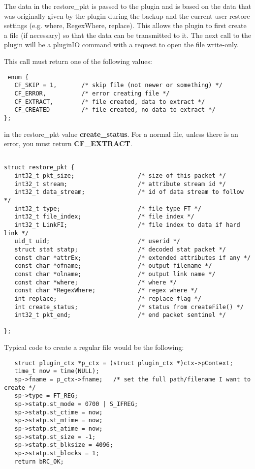 The data in the 
restore\_pkt is passed to the plugin and is based on the data that was
originally given by the plugin during the backup and the current user
restore settings (e.g. where, RegexWhere, replace).  This allows the
plugin to first create a file (if necessary) so that the data can
be transmitted to it.  The next call to the plugin will be a
pluginIO command with a request to open the file write-only.

This call must return one of the following values:

\begin{verbatim}
 enum {
   CF_SKIP = 1,       /* skip file (not newer or something) */
   CF_ERROR,          /* error creating file */
   CF_EXTRACT,        /* file created, data to extract */
   CF_CREATED         /* file created, no data to extract */
};
\end{verbatim}

in the restore\_pkt value {\bf create\_status}.  For a normal file,
unless there is an error, you must return {\bf CF\_EXTRACT}.

\begin{verbatim}
 
struct restore_pkt {
   int32_t pkt_size;                  /* size of this packet */
   int32_t stream;                    /* attribute stream id */
   int32_t data_stream;               /* id of data stream to follow */
   int32_t type;                      /* file type FT */
   int32_t file_index;                /* file index */
   int32_t LinkFI;                    /* file index to data if hard link */
   uid_t uid;                         /* userid */
   struct stat statp;                 /* decoded stat packet */
   const char *attrEx;                /* extended attributes if any */
   const char *ofname;                /* output filename */
   const char *olname;                /* output link name */
   const char *where;                 /* where */
   const char *RegexWhere;            /* regex where */
   int replace;                       /* replace flag */
   int create_status;                 /* status from createFile() */
   int32_t pkt_end;                   /* end packet sentinel */

};
\end{verbatim}

Typical code to create a regular file would be the following:

\begin{verbatim}
   struct plugin_ctx *p_ctx = (struct plugin_ctx *)ctx->pContext;
   time_t now = time(NULL);
   sp->fname = p_ctx->fname;   /* set the full path/filename I want to create */
   sp->type = FT_REG;
   sp->statp.st_mode = 0700 | S_IFREG;
   sp->statp.st_ctime = now;
   sp->statp.st_mtime = now;
   sp->statp.st_atime = now;
   sp->statp.st_size = -1;
   sp->statp.st_blksize = 4096;
   sp->statp.st_blocks = 1;
   return bRC_OK;
\end{verbatim}

